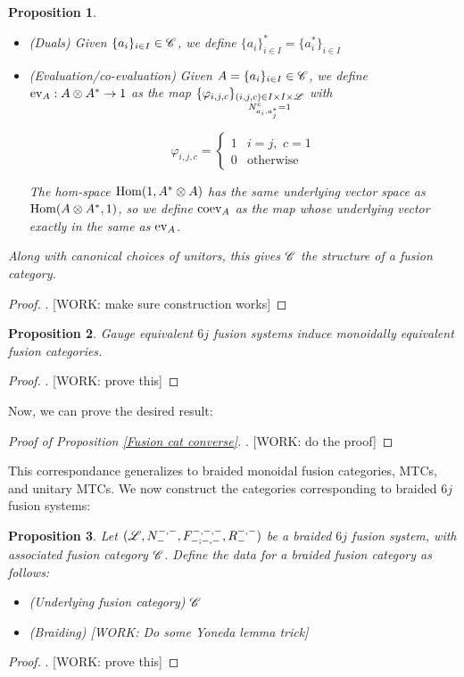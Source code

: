\documentclass{article}
\newtheorem{proposition}{Proposition}[section]
\theoremstyle{definition}
\numberwithin{figure}{section}
\begin{document}
\begin{proposition}
\begin{itemize}
\item (Duals) Given $\{a_{i}\}_{i\in I}\in \mathscr{C}$, we define $\{a_{i}\}^{*}_{i\in I}=\{a_{i}^{*}\}_{i\in I}$

\item (Evaluation/co-evaluation) Given $A=\{a_{i}\}_{i\in I}\in \mathscr{C}$, we define $\mathrm{ev}_{A}:A\otimes A^{*}\to 1$ as the map $\{\varphi_{i,j,c}\}_{\substack{(i,j,c)\in I\times I \times \mathscr{L} \\ N^{c}_{a_i,a^{*}_j}=1}}$ with

$$\varphi_{i,j,c}=
\begin{cases}
1 & i=j, \,\, c=1\\
0 & \text{otherwise}
\end{cases}$$

The hom-space $\mathrm{Hom}(1, A^{*}\otimes A)$ has the same underlying vector space as $\mathrm{Hom}(A\otimes A^{*},1)$, so we define $\mathrm{coev}_{A}$ as the map whose underlying vector exactly in the same as $\mathrm{ev}_{A}$.
\end{itemize}

Along with canonical choices of unitors, this gives $\mathscr{C}$ the structure of a fusion category.
\end{proposition}
\begin{proof}. [WORK: make sure construction works]
\end{proof}

\begin{proposition} Gauge equivalent $6j$ fusion systems induce monoidally equivalent fusion categories.
\end{proposition}
\begin{proof}. [WORK: prove this]
\end{proof}

Now, we can prove the desired result:

\begin{proof}[Proof of Proposition \ref{Fusion cat converse}]. [WORK: do the proof]
\end{proof}


This correspondance generalizes to braided monoidal fusion categories, MTCs, and unitary MTCs. We now construct the categories corresponding to braided $6j$ fusion systems:

\begin{proposition} Let $(\mathscr{L},N^{\--,\--}_{\--},F^{\--,\--,\--}_{\--;\--,\--},R^{\--,\--}_{\--})$ be a braided $6j$ fusion system, with associated fusion category $\mathscr{C}$.  Define the data for a braided fusion category as follows:

\begin{itemize}
\item (Underlying fusion category)  $\mathscr{C}$
\item (Braiding) [WORK: Do some Yoneda lemma trick]
\end{itemize}
\end{proposition}
\begin{proof}. [WORK: prove this]
\end{proof}
\end{document}
